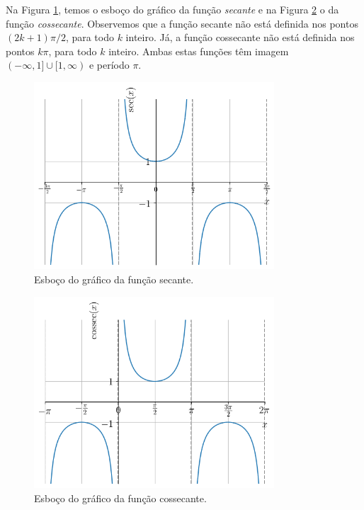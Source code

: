 Na Figura \ref{fig:sec_grafico}, temos o esboço do gráfico da função \emph{secante} e na Figura \ref{fig:cossec_grafico} o da função \emph{cossecante}. Observemos que a função secante não está definida nos pontos $(2k+1)\pi/2$, para todo $k$ inteiro. Já, a função cossecante não está definida nos pontos $k\pi$, para todo $k$ inteiro. Ambas estas funções têm imagem $(-\infty, 1]\cup [1, \infty)$ e período $\pi$.

\begin{figure}[H]
  \centering
  \includegraphics[width=0.8\textwidth]{./cap_funcao/dados/fig_co_sec_graficos/fig_sec_grafico}
  \caption{Esboço do gráfico da função secante.}
  \label{fig:sec_grafico}
\end{figure}

\begin{figure}[H]
  \centering
  \includegraphics[width=0.8\textwidth]{./cap_funcao/dados/fig_co_sec_graficos/fig_cosec_grafico}
  \caption{Esboço do gráfico da função cossecante.}
  \label{fig:cossec_grafico}
\end{figure}

